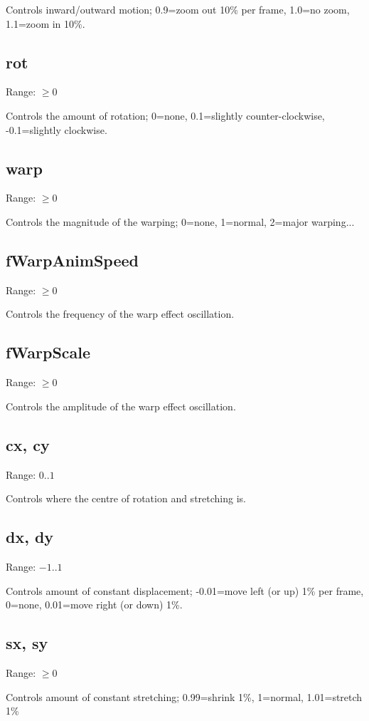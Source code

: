 \documentclass[11pt, a5paper, pagesize]{scrbook}
\begin{document}
Controls inward/outward motion; 0.9=zoom out 10\% per frame, 1.0=no zoom, 1.1=zoom in 10\%.

\subsection{rot}
Range: $\geq 0$

Controls the amount of rotation; 0=none, 0.1=slightly counter-clockwise, -0.1=slightly clockwise.

\subsection{warp}
Range: $\geq 0$

Controls the magnitude of the warping; 0=none, 1=normal, 2=major warping...

\subsection{fWarpAnimSpeed}
Range: $\geq 0$

Controls the frequency of the warp effect oscillation.

\subsection{fWarpScale}
Range: $\geq 0$

Controls the amplitude of the warp effect oscillation.

\subsection{cx, cy}
Range: $0..1$

Controls where the centre of rotation and stretching is.

\subsection{dx, dy}
Range: $-1..1$

Controls amount of constant displacement; -0.01=move left (or up) 1\% per frame, 0=none, 0.01=move right (or down) 1\%.

\subsection{sx, sy}
Range: $\geq 0$

Controls amount of constant stretching; 0.99=shrink 1\%, 1=normal, 1.01=stretch 1\%  
\end{document}
